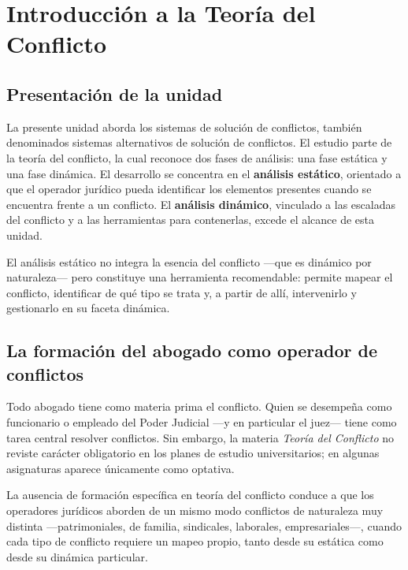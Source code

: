 \documentclass[12pt,oneside]{book}
\begin{document}
\tableofcontents

\mainmatter

\chapter{Introducción a la Teoría del Conflicto}

\section{Presentación de la unidad}

La presente unidad aborda los sistemas de solución de conflictos, también denominados sistemas alternativos de solución de conflictos. El estudio parte de la teoría del conflicto, la cual reconoce dos fases de análisis: una fase estática y una fase dinámica. El desarrollo se concentra en el \textbf{análisis estático}, orientado a que el operador jurídico pueda identificar los elementos presentes cuando se encuentra frente a un conflicto. El \textbf{análisis dinámico}, vinculado a las escaladas del conflicto y a las herramientas para contenerlas, excede el alcance de esta unidad.

El análisis estático no integra la esencia del conflicto ---que es dinámico por naturaleza--- pero constituye una herramienta recomendable: permite mapear el conflicto, identificar de qué tipo se trata y, a partir de allí, intervenirlo y gestionarlo en su faceta dinámica.

\section{La formación del abogado como operador de conflictos}

Todo abogado tiene como materia prima el conflicto. Quien se desempeña como funcionario o empleado del Poder Judicial ---y en particular el juez--- tiene como tarea central resolver conflictos. Sin embargo, la materia \textit{Teoría del Conflicto} no reviste carácter obligatorio en los planes de estudio universitarios; en algunas asignaturas aparece únicamente como optativa.

\begin{important}
La ausencia de formación específica en teoría del conflicto conduce a que los operadores jurídicos aborden de un mismo modo conflictos de naturaleza muy distinta ---patrimoniales, de familia, sindicales, laborales, empresariales---, cuando cada tipo de conflicto requiere un mapeo propio, tanto desde su estática como desde su dinámica particular.
\end{important}
\end{document}
